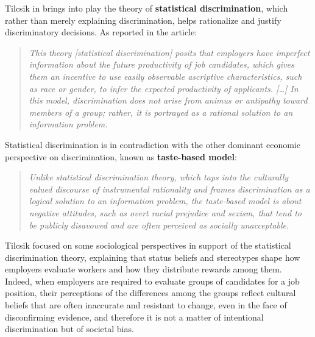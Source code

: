 Tilcsik in \cite{tilcsik2021statistical} brings into play the theory of \textbf{statistical discrimination}, which rather than merely explaining discrimination, helps rationalize and justify discriminatory decisions. As reported in the article:
\begin{quote}\emph{This theory \emph{[statistical discrimination]} posits that employers have imperfect information about the future productivity of job candidates, which gives them an incentive to use easily observable ascriptive characteristics, such as race or gender, to infer the expected productivity of applicants. \emph{[\ldots]} In this model, discrimination does not arise from animus or antipathy toward members of a group; rather, it is portrayed as a rational solution to an information problem.} \cite[p.~94]{tilcsik2021statistical}\end{quote}

Statistical discrimination is in contradiction with the other dominant economic perspective on discrimination, known as \textbf{taste-based model}:
\begin{quote}\emph{Unlike statistical discrimination theory, which taps into the culturally valued discourse of instrumental rationality and frames discrimination as a logical solution to an information problem, the taste-based model is about negative attitudes, such as overt racial prejudice and sexism, that tend to be publicly disavowed and are often perceived as socially unacceptable.} \cite[p.~95]{tilcsik2021statistical}\end{quote}

Tilcsik focused on some sociological perspectives in support of the statistical discrimination theory, explaining that status beliefs and stereotypes shape how employers evaluate workers and how they distribute rewards among them. Indeed, when employers are required to evaluate groups of candidates for a job position, their perceptions of the differences among the groups reflect cultural beliefs that are often inaccurate and resistant to change, even in the face of disconfirming evidence, and therefore it is not a matter of intentional discrimination but of societal bias.


